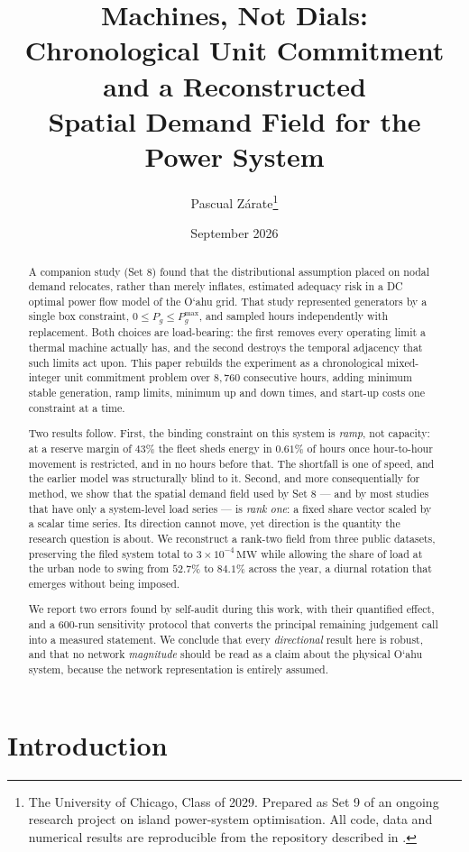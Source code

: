 \documentclass[11pt,a4paper]{article}
\title{\bfseries Machines, Not Dials:\\[0.25em]
\large Chronological Unit Commitment and a Reconstructed\\
Spatial Demand Field for the \Oahu{} Power System}
\author{Pascual Z\'arate\thanks{The University of Chicago, Class of 2029.
Prepared as Set 9 of an ongoing research project on island power-system
optimisation. All code, data and numerical results are reproducible from the
repository described in \Cref{app:repro}.}}
\date{September 2026}
\theoremstyle{definition}
\theoremstyle{plain}
\theoremstyle{remark}
\newcommand{\MW}{\,\mathrm{MW}}
\newcommand{\okina}{\textquoteleft}
\newcommand{\Oahu}{O\okina ahu}
\begin{document}
\maketitle

\begin{abstract}
\noindent
A companion study (Set 8) found that the distributional assumption placed on
nodal demand relocates, rather than merely inflates, estimated adequacy risk in
a DC optimal power flow model of the \Oahu{} grid. That study represented
generators by a single box constraint, $0 \le P_g \le P_g^{\max}$, and sampled
hours independently with replacement. Both choices are load-bearing: the first
removes every operating limit a thermal machine actually has, and the second
destroys the temporal adjacency that such limits act upon. This paper rebuilds
the experiment as a chronological mixed-integer unit commitment problem over
$8{,}760$ consecutive hours, adding minimum stable generation, ramp limits,
minimum up and down times, and start-up costs one constraint at a time.

Two results follow. First, the binding constraint on this system is
\emph{ramp}, not capacity: at a reserve margin of $43\%$ the fleet sheds energy
in $0.61\%$ of hours once hour-to-hour movement is restricted, and in no hours
before that. The shortfall is one of speed, and the earlier model was
structurally blind to it. Second, and more consequentially for method, we show
that the spatial demand field used by Set 8 --- and by most studies that have
only a system-level load series --- is \emph{rank one}: a fixed share vector
scaled by a scalar time series. Its direction cannot move, yet direction is the
quantity the research question is about. We reconstruct a rank-two field from
three public datasets, preserving the filed system total to
$3\times10^{-4}\MW$ while allowing the share of load at the urban node to swing
from $52.7\%$ to $84.1\%$ across the year, a diurnal rotation that emerges
without being imposed.

We report two errors found by self-audit during this work, with their
quantified effect, and a $600$-run sensitivity protocol that converts the
principal remaining judgement call into a measured statement. We conclude that
every \emph{directional} result here is robust, and that no network
\emph{magnitude} should be read as a claim about the physical \Oahu{} system,
because the network representation is entirely assumed.
\end{abstract}

\section{Introduction}
\label{sec:intro}
\end{document}
